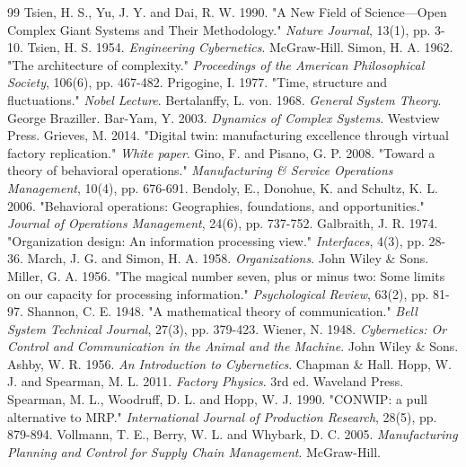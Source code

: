 \documentclass[11pt,a4paper]{article}
\begin{document}

\begin{thebibliography}{99}
 Tsien, H. S., Yu, J. Y. and Dai, R. W. 1990. "A New Field of Science—Open Complex Giant Systems and Their Methodology." \textit{Nature Journal}, 13(1), pp. 3-10.
 Tsien, H. S. 1954. \textit{Engineering Cybernetics}. McGraw-Hill.
 Simon, H. A. 1962. "The architecture of complexity." \textit{Proceedings of the American Philosophical Society}, 106(6), pp. 467-482.
 Prigogine, I. 1977. "Time, structure and fluctuations." \textit{Nobel Lecture}.
 Bertalanffy, L. von. 1968. \textit{General System Theory}. George Braziller.
 Bar-Yam, Y. 2003. \textit{Dynamics of Complex Systems}. Westview Press.
 Grieves, M. 2014. "Digital twin: manufacturing excellence through virtual factory replication." \textit{White paper}.
 Gino, F. and Pisano, G. P. 2008. "Toward a theory of behavioral operations." \textit{Manufacturing \& Service Operations Management}, 10(4), pp. 676-691.
 Bendoly, E., Donohue, K. and Schultz, K. L. 2006. "Behavioral operations: Geographies, foundations, and opportunities." \textit{Journal of Operations Management}, 24(6), pp. 737-752.
 Galbraith, J. R. 1974. "Organization design: An information processing view." \textit{Interfaces}, 4(3), pp. 28-36.
 March, J. G. and Simon, H. A. 1958. \textit{Organizations}. John Wiley \& Sons.
 Miller, G. A. 1956. "The magical number seven, plus or minus two: Some limits on our capacity for processing information." \textit{Psychological Review}, 63(2), pp. 81-97.
 Shannon, C. E. 1948. "A mathematical theory of communication." \textit{Bell System Technical Journal}, 27(3), pp. 379-423.
 Wiener, N. 1948. \textit{Cybernetics: Or Control and Communication in the Animal and the Machine}. John Wiley \& Sons.
 Ashby, W. R. 1956. \textit{An Introduction to Cybernetics}. Chapman \& Hall.
 Hopp, W. J. and Spearman, M. L. 2011. \textit{Factory Physics}. 3rd ed. Waveland Press.
 Spearman, M. L., Woodruff, D. L. and Hopp, W. J. 1990. "CONWIP: a pull alternative to MRP." \textit{International Journal of Production Research}, 28(5), pp. 879-894.
 Vollmann, T. E., Berry, W. L. and Whybark, D. C. 2005. \textit{Manufacturing Planning and Control for Supply Chain Management}. McGraw-Hill.

\end{thebibliography}
\end{document}
